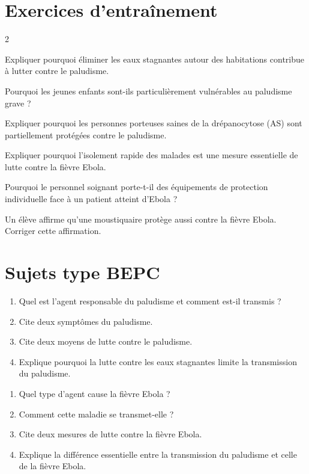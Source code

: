 \section{Exercices d'entraînement}
\begin{multicols}{2}

\exo{} Expliquer pourquoi éliminer les eaux stagnantes autour des habitations
contribue à lutter contre le paludisme.

\exo{} Pourquoi les jeunes enfants sont-ils particulièrement vulnérables au
paludisme grave ?

\exo{} Expliquer pourquoi les personnes porteuses saines de la drépanocytose
(AS) sont partiellement protégées contre le paludisme.

\exo{} Expliquer pourquoi l'isolement rapide des malades est une mesure
essentielle de lutte contre la fièvre Ebola.

\exo{} Pourquoi le personnel soignant porte-t-il des équipements de
protection individuelle face à un patient atteint d'Ebola ?

\exo{} Un élève affirme qu'une moustiquaire protège aussi contre la fièvre
Ebola. Corriger cette affirmation.

\end{multicols}

\section{Sujets type BEPC}

\sujetbac[Le paludisme]
\begin{enumerate}[label=\arabic*)]
\item Quel est l'agent responsable du paludisme et comment est-il transmis ?
\item Cite deux symptômes du paludisme.
\item Cite deux moyens de lutte contre le paludisme.
\item Explique pourquoi la lutte contre les eaux stagnantes limite la transmission
du paludisme.
\end{enumerate}

\begin{enumerate}[label=\arabic*)]
\item Quel type d'agent cause la fièvre Ebola ?
\item Comment cette maladie se transmet-elle ?
\item Cite deux mesures de lutte contre la fièvre Ebola.
\item Explique la différence essentielle entre la transmission du paludisme et celle
de la fièvre Ebola.
\end{enumerate}

